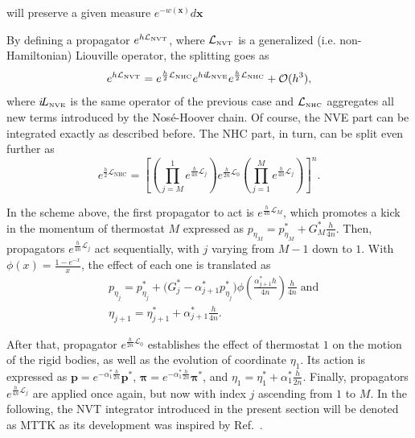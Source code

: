 \documentclass[
journal=jctcce,
layout=twocolumn
]{achemso}
\newcommand{\vt}[1]{\boldsymbol{\mathbf{#1}}}   %
\newcommand{\Liu}[1]{i\!L_\text{#1}}            %
\newcommand{\timestep}{h}
\begin{document}
will preserve a given measure $e^{-w(\vt x)}d\vt x$ 

By defining a propagator $e^{\timestep \mathcal{L}_\text{\tiny NVT}}$, where $\mathcal{L}_\text{\tiny NVT}$ is a generalized (i.e.
non-Hamiltonian) Liouville operator, the splitting goes as
\begin{equation}
\label{eq:splitting NVT}
e^{\timestep \mathcal{L}_\text{\tiny NVT}} = e^{\frac{\timestep}{2} \mathcal{L}_\text{\tiny NHC}} e^{\timestep \Liu{\tiny NVE}} e^{\frac{\timestep}{2} \mathcal{L}_\text{\tiny NHC}} + \mathcal{O}(\timestep^3),
\end{equation}
where $\Liu{\tiny NVE}$ is the same operator of the previous case and $\mathcal{L}_\text{\tiny NHC}$ aggregates all new terms introduced by the Nos\'e-Hoover chain.
Of course, the NVE part can be integrated exactly as described before.
The NHC part, in turn, can be split even further as
\begin{equation*}
e^{\frac{\timestep}{2} \mathcal{L}_\text{NHC}} = \left[ \left( \textstyle\prod\limits_{j=M}^1 e^{\frac{\timestep}{4n} \mathcal{L}_j }\right) e^{\frac{\timestep}{2n} \mathcal{L}_0 } \left(  \textstyle\prod\limits_{j=1}^M e^{\frac{\timestep}{4n} \mathcal{L}_j }\right)  \right]^n.
\end{equation*}

In the scheme above, the first propagator to act is $e^{\frac{\timestep}{4n} \mathcal{L}_M}$, which promotes a kick in the momentum of thermostat $M$ expressed as $p_{\eta_M} = p_{\eta_M}^\ast + G_M^\ast \frac{\timestep}{4n}$.
Then, propagators $e^{\frac{\timestep}{4n} \mathcal{L}_j}$ act sequentially, with $j$ varying from $M-1$ down to $1$.
With $\phi(x) = \frac{1-e^{-x}}{x}$, the effect of each one is translated as \cite{Martyna_1996}
\begin{align*}
&p_{\eta_j} = p_{\eta_j}^\ast + \Big( G_j^\ast - \alpha_{j+1}^\ast p_{\eta_j}^\ast \Big) \phi\left(\frac{\alpha_{j+1}^\ast \timestep}{4n}\right) \frac{\timestep}{4n} \; \text{and} \\
&\eta_{j+1} = \eta_{j+1}^\ast + \alpha_{j+1}^\ast \frac{\timestep}{4n}.
\end{align*}

After that, propagator $e^{\frac{\timestep}{2n} \mathcal{L}_0}$ establishes the effect of thermostat $1$ on the motion of the rigid bodies, as well as the evolution of coordinate $\eta_1$.
Its action is expressed as ${\vt p} = e^{-\alpha_1^\ast \frac{\timestep}{2n}} {\vt p}^\ast$, ${\vt \pi} = e^{-\alpha_1^\ast \frac{\timestep}{2n}} {\vt \pi}^\ast$, and $\eta_1 = \eta_1^\ast + \alpha_1^\ast \frac{\timestep}{2n}$.
Finally, propagators $e^{\frac{\timestep}{4n} \mathcal{L}_j}$ are applied once again, but now with index $j$ ascending from $1$ to $M$.
In the following, the NVT integrator introduced in the present section will be denoted as MTTK as its development was inspired by Ref.~\cite{Martyna_1996}.
\end{document}
